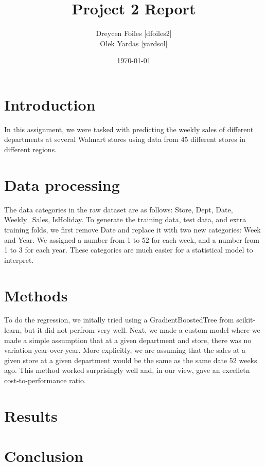 \documentclass{article}
\title{Project 2 Report}
\author{Dreycen Foiles [dfoiles2] \\ Olek Yardas [yardsol]}
\date{\today}
\begin{document}
\maketitle

\section{Introduction}
In this assignment, we were tasked with predicting the weekly sales of
different departments at several Walmart stores using data from 45 different
stores in different regions.

\section{Data processing}
The data categories in the raw dataset are as follows: Store, Dept, Date,
Weekly\_Sales, IsHoliday. To generate the training data, test data, and extra
training folds, we first remove Date and replace it with two new categories:
Week and Year. We assigned a number from 1 to 52 for each week, and a number
from 1 to 3 for each year. These categories are much easier for a statistical model to interpret.

\section{Methods}
To do the regression, we initally tried using a GradientBoostedTree from
scikit-learn, but it did not perfrom very well. Next, we made a custom model
where we made a simple assumption that at a given department and store, there
was no variation year-over-year. More explicitly, we are assuming that the sales
at a given store at a given department would be the same as the same date 52
weeks ago. This method worked surprisingly well and, in our view, gave an excelletn cost-to-performance ratio.

\section{Results}

\section{Conclusion}
\end{document}
